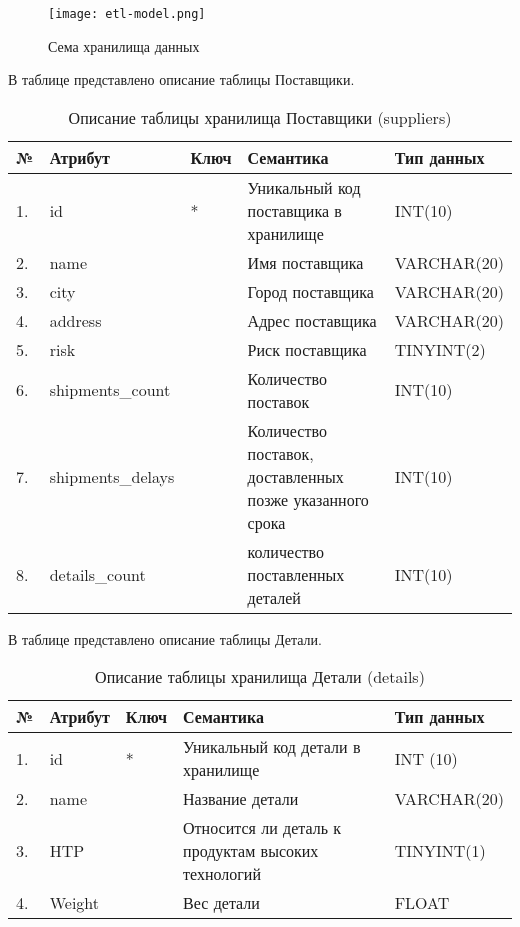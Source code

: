 \begin{figure}[h]
  \centering
  \texttt{[image: etl-model.png]}
  \caption{Сема хранилища данных}
  \label{etl-diagram}
\end{figure}

В таблице  представлено описание таблицы Поставщики.
\begin{table}[h]
	\caption{\space Описание таблицы хранилища Поставщики (suppliers)}
	\label{etl-suppliers}
	\begin{tabular}{|p{0.4cm}|p{2.5cm}|p{1.5cm}|p{6.3cm}|p{3.2cm}|}
		\hline
		\textbf{№} & \textbf{Атрибут} & \textbf{Ключ} & \textbf{Семантика} & \textbf{Тип данных} \\
		\hline
		1. & id & * & Уникальный код поставщика в хранилище & INT(10) \\
		\hline
		2. & name & & Имя поставщика & VARCHAR(20) \\
		\hline
		3. & city & & Город поставщика & VARCHAR(20) \\
		\hline
		4. & address & & Адрес поставщика & VARCHAR(20) \\
		\hline
		5. & risk & & Риск поставщика & TINYINT(2) \\
		\hline
		6. & shipments\_count & & Количество поставок & INT(10) \\
		\hline
		7. & shipments\_delays & & Количество поставок, доставленных позже указанного срока & INT(10) \\
		\hline
		8. & details\_count & & количество поставленных деталей & INT(10) \\
		\hline
	\end{tabular}
\end{table}

В таблице  представлено описание таблицы Детали.
\begin{table}[h]
	\caption{\space Описание таблицы хранилища Детали (details)}
	\label{etl-parts}
	\begin{tabular}{|p{0.4cm}|p{2.5cm}|p{1.5cm}|p{6.3cm}|p{3.2cm}|}
		\hline
		\textbf{№} & \textbf{Атрибут} & \textbf{Ключ} & \textbf{Семантика} & \textbf{Тип данных} \\
		\hline
		1. & id & * & Уникальный код детали в хранилище & INT (10) \\
		\hline
		2. & name & & Название детали & VARCHAR(20) \\
		\hline
		3. & HTP & & Относится ли деталь к продуктам высоких технологий & TINYINT(1) \\
		\hline
		4. & Weight & & Вес детали & FLOAT \\
		\hline
	\end{tabular}
\end{table}

